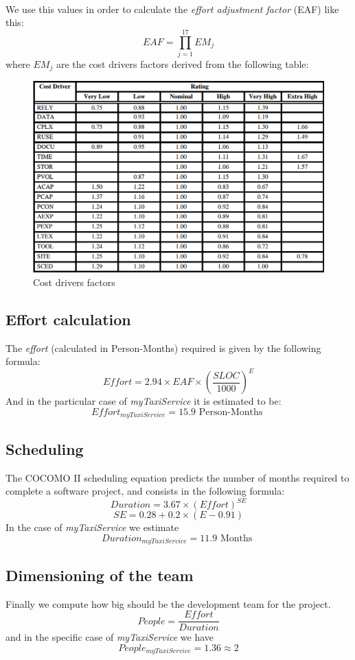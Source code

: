 \paragraph{} We use this values in order to calculate the \textit{effort adjustment factor} (EAF) like this:
$$EAF = \prod_{j=1}^{17}EM_j$$ where $EM_j$ are the cost drivers factors derived from the following table:
\begin{figure}[H]
\centering
\includegraphics[trim = 50 0 0 0,scale=0.5]{Size_Cost_Effort/costFactors}
\caption{Cost drivers factors}
\end{figure}

\subsection{Effort calculation}
The \textit{effort} (calculated in Person-Months) required is given by the following formula:
$$Effort = 2.94 \times EAF \times \left(\frac{SLOC}{1000}\right)^E$$
And in the particular case of \textit{myTaxiService} it is estimated to be:$$Effort_{myTaxiService} = 15.9 \mbox{ Person-Months }$$

\subsection{Scheduling}
The COCOMO II scheduling equation predicts the number of months required to complete a software project, and consists in the following formula:
$$Duration = 3.67 \times (Effort)^{SE}$$ $$SE = 0.28 + 0.2 \times (E - 0.91)$$
In the case of \textit{myTaxiService} we estimate $$Duration_{myTaxiService} = 11.9 \mbox{ Months }$$

\subsection{Dimensioning of the team}
Finally we compute how big should be the development team for the project. $$People = \frac{Effort}{Duration}$$ and in the specific case of \textit{myTaxiService} we have $$People_{myTaxiService} = 1.36 \approx 2$$

